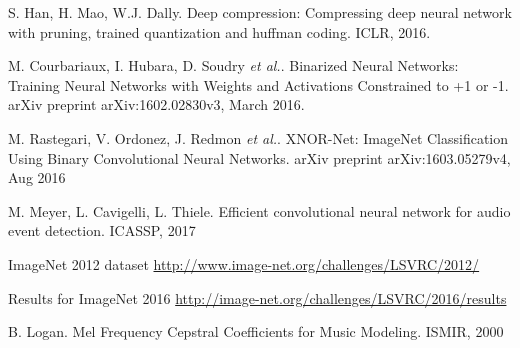 \documentclass[conference]{IEEEtran}
\begin{document}
\begin{thebibliography}{99}
S. Han, H. Mao, W.J. Dally. Deep compression: Compressing deep neural network with pruning, trained quantization and huffman coding. ICLR, 2016.

M. Courbariaux, I. Hubara, D. Soudry \textit{et al.}. Binarized Neural Networks: Training Neural Networks with Weights and Activations Constrained to +1 or -1. arXiv preprint arXiv:1602.02830v3, March 2016.

M. Rastegari, V. Ordonez, J. Redmon \textit{et al.}. XNOR-Net: ImageNet Classification Using Binary Convolutional Neural Networks. arXiv preprint arXiv:1603.05279v4, Aug 2016

M. Meyer, L. Cavigelli, L. Thiele. Efficient convolutional neural network for audio event detection. ICASSP, 2017

ImageNet 2012 dataset \url{http://www.image-net.org/challenges/LSVRC/2012/}

Results for ImageNet 2016 \url{http://image-net.org/challenges/LSVRC/2016/results}

B. Logan. Mel Frequency Cepstral Coefficients for Music Modeling. ISMIR, 2000

\end{thebibliography}




\end{document}
